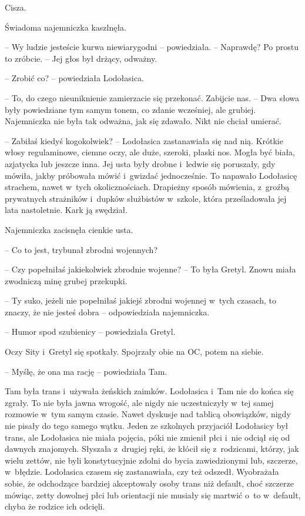 \documentclass[oneside,polish,11pt,sfheadings]{mwbk}
\begin{document}
Cisza.

Świadoma najemniczka kaszlnęła.

-- Wy ludzie jesteście kurwa niewiarygodni -- powiedziała. -- Naprawdę? Po
prostu to zróbcie. -- Jej głos był drżący, odważny.

-- Zrobić co? -- powiedziała Lodołasica.

-- To, do czego nieuniknienie zamierzacie się przekonać. Zabijcie nas. -- Dwa słowa były powiedziane tym samym tonem, co zdanie wcześniej, ale
grubiej. Najemniczka nie była tak odważna, jak się zdawało. Nikt nie
chciał umierać.

-- Zabiłaś kiedyś kogokolwiek? -- Lodołasica zastanawiała się nad nią.
Krótkie włosy regulaminowe, ciemne oczy, ale duże, szeroki, płaski nos.
Mogła być biała, azjatycka lub jeszcze inna. Jej usta były drobne i~ledwie się poruszały, gdy mówiła, jakby próbowała mówić i~gwizdać
jednocześnie. To napawało Lodołasicę strachem, nawet w~tych
okolicznościach. Drapieżny sposób mówienia, z~groźbą prywatnych
strażników i~dupków służbistów w~szkole, która prześladowała jej lata
nastoletnie. Kark ją swędział.

Najemniczka zacisnęła cienkie usta. 

-- Co to jest, trybunał zbrodni
wojennych?

-- Czy popełniłaś jakiekolwiek zbrodnie wojenne? -- To była Gretyl. Znowu
miała zwodniczą minę grubej przekupki.

-- Ty suko, jeżeli nie popełniłaś jakiejś zbrodni wojennej w~tych
czasach, to znaczy, że nie jesteś dobra -- odpowiedziała najemniczka.

-- Humor spod szubienicy -- powiedziała Gretyl.

Oczy Sity i~Gretyl się spotkały. Spojrzały obie na OC, potem na siebie.

-- Myślę, że ona ma rację -- powiedziała Tam. 

Tam była trans i~używała
żeńskich zaimków. Lodołasica i~Tam nie do końca się zgrały. To nie była
jawna wrogość, ale nigdy nie uczestniczyły w~tej samej rozmowie w~tym
samym czasie. Nawet dyskusje nad tablicą obowiązków, nigdy nie pisały do
tego samego wątku. Jeden ze szkolnych przyjaciół Lodołasicy był trans,
ale Lodołasica nie miała pojęcia, póki nie zmienił płci i~nie odciął się
od dawnych znajomych. Słyszała z~drugiej ręki, że kłócił się z~rodzicami, którzy, jak wielu zettów, nie byli konstytucyjnie zdolni do
bycia zawiedzionymi lub, szczerze, w~błędzie. Lodołasica czasem się
zastanawiała, czy też odszedł. Wyobrażała sobie, że odchodzące bardziej
akceptowały osoby trans niż default, choć szczerze mówiąc, zetty
dowolnej płci lub orientacji nie musiały się martwić o~to w~default,
chyba że rodzice ich odcięli.
\end{document}

